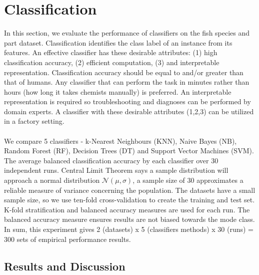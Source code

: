 \documentclass[runningheads]{llncs}
\begin{document}
\section{Classification}


In this section, we evaluate the performance of classifiers on the fish species and part dataset.
Classification identifies the class label of an instance from its features. 
An effective classifier has these desirable attributes: (1) high classification accuracy, (2) efficient computation, (3) and interpretable representation.
Classification accuracy should be equal to and/or greater than that of humans.
Any classifier that can perform the task in minutes rather than hours (how long it takes chemists manually) is preferred. 
An interpretable representation is required so troubleshooting and diagnoses can be performed by domain experts.
A classifier with these desirable attributes (1,2,3) can be utilized in a factory setting. 
\\\\
We compare 5 classifiers \cite{fix1989discriminatory,hand2001idiot,ho1995random,loh2011classification,cortes1995support} - k-Nearest Neighbours (KNN), Naive Bayes (NB), Random Forest (RF), Decision Trees (DT) and Support Vector Machines (SVM).
The average balanced classification accuracy by each classifier over 30 independent runs.
Central Limit Theorem says a sample distribution will approach a normal distribution $\mathcal{N}(\mu,\sigma)$, a sample size of 30 approximates a reliable measure of variance concerning the population. 
The datasets have a small sample size, so we use ten-fold cross-validation to create the training and test set.
K-fold stratification and balanced accuracy measures are used for each run. 
The balanced accuracy measure ensures results are not biased towards the mode class. 
In sum, this experiment gives 2 (datasets) x 5 (classifiers methods) x 30 (runs) = 300
sets of empirical performance results.

\subsection{Results and Discussion}
\end{document}

